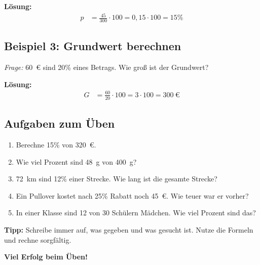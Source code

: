 \textbf{Lösung:}
\begin{align*}
    p &= \frac{45}{300} \cdot 100 = 0{,}15 \cdot 100 = 15\%
\end{align*}

\subsection*{Beispiel 3: Grundwert berechnen}
\textit{Frage:} 60~\euro{} sind 20\% eines Betrags. Wie groß ist der Grundwert?

\textbf{Lösung:}
\begin{align*}
    G &= \frac{60}{20} \cdot 100 = 3 \cdot 100 = 300~\euro
\end{align*}

\subsection*{Aufgaben zum Üben}
\begin{enumerate}
    \item Berechne 15\% von 320~\euro.
    \item Wie viel Prozent sind 48~g von 400~g?
    \item 72~km sind 12\% einer Strecke. Wie lang ist die gesamte Strecke?
    \item Ein Pullover kostet nach 25\% Rabatt noch 45~\euro. Wie teuer war er vorher?
    \item In einer Klasse sind 12 von 30 Schülern Mädchen. Wie viel Prozent sind das?
\end{enumerate}

\vspace{1cm}
\textbf{Tipp:} Schreibe immer auf, was gegeben und was gesucht ist. Nutze die Formeln und rechne sorgfältig.

\textbf{Viel Erfolg beim Üben!}
